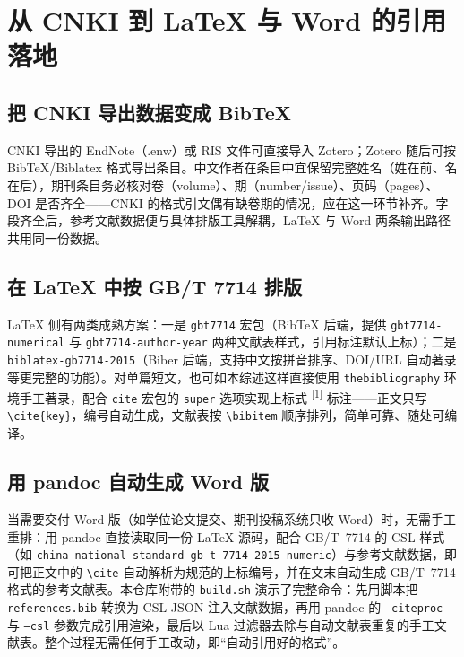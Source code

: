 \documentclass[UTF8, zihao=-4, fontset=fandol]{ctexart}
\begin{document}
\section{从 CNKI 到 LaTeX 与 Word 的引用落地}

\subsection{把 CNKI 导出数据变成 BibTeX}

CNKI 导出的 EndNote（.enw）或 RIS 文件可直接导入 Zotero；Zotero 随后可按 BibTeX/Biblatex 格式导出条目\cite{zotero}。中文作者在条目中宜保留完整姓名（姓在前、名在后），期刊条目务必核对卷（volume）、期（number/issue）、页码（pages）、DOI 是否齐全——CNKI 的格式引文偶有缺卷期的情况，应在这一环节补齐。字段齐全后，参考文献数据便与具体排版工具解耦，LaTeX 与 Word 两条输出路径共用同一份数据。

\subsection{在 LaTeX 中按 GB/T 7714 排版}

LaTeX 侧有两类成熟方案：一是 \texttt{gbt7714} 宏包（BibTeX 后端，提供 \texttt{gbt7714-numerical} 与 \texttt{gbt7714-author-year} 两种文献表样式，引用标注默认上标）；二是 \texttt{biblatex-gb7714-2015}（Biber 后端，支持中文按拼音排序、DOI/URL 自动著录等更完整的功能）\cite{biblatex_gb7714}。对单篇短文，也可如本综述这样直接使用 \texttt{thebibliography} 环境手工著录，配合 \texttt{cite} 宏包的 \texttt{super} 选项实现上标式 \textsuperscript{[1]} 标注——正文只写 \texttt{\textbackslash cite\{key\}}，编号自动生成，文献表按 \texttt{\textbackslash bibitem} 顺序排列，简单可靠、随处可编译。

\subsection{用 pandoc 自动生成 Word 版}

当需要交付 Word 版（如学位论文提交、期刊投稿系统只收 Word）时，无需手工重排：用 pandoc 直接读取同一份 LaTeX 源码，配合 GB/T~7714 的 CSL 样式（如 \texttt{china-national-standard-gb-t-7714-2015-numeric}）与参考文献数据，即可把正文中的 \texttt{\textbackslash cite} 自动解析为规范的上标编号，并在文末自动生成 GB/T~7714 格式的参考文献表\cite{pandoc}。本仓库附带的 \texttt{build.sh} 演示了完整命令：先用脚本把 \texttt{references.bib} 转换为 CSL-JSON 注入文献数据，再用 pandoc 的 \texttt{--citeproc} 与 \texttt{--csl} 参数完成引用渲染，最后以 Lua 过滤器去除与自动文献表重复的手工文献表。整个过程无需任何手工改动，即“自动引用好的格式”。
\end{document}
